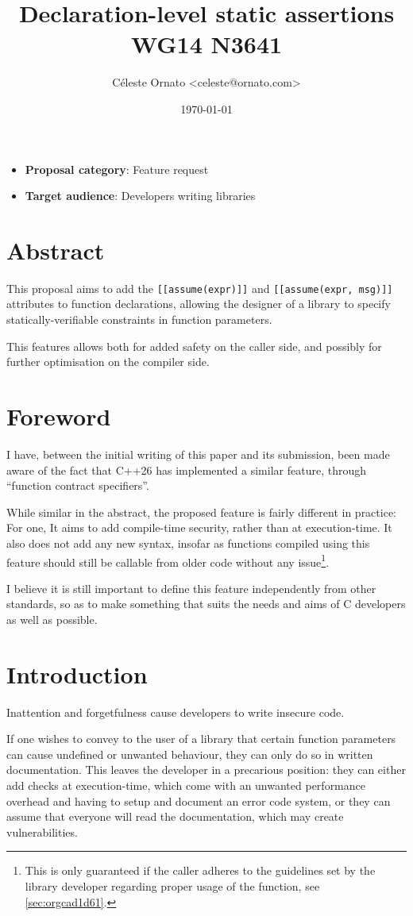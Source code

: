 \documentclass[a4paper, 12pt]{article}
\author{Céleste Ornato <celeste@ornato.com>}
\date{\today}
\title{Declaration-level static assertions\\\medskip
\large WG14 N3641}
\begin{document}
\maketitle
\begin{itemize}
\item \textbf{Proposal category}: Feature request
\item \textbf{Target audience}: Developers writing libraries
\end{itemize}
\section{Abstract}
\label{sec:org43b546d}
This proposal aims to add the \texttt{[[assume(expr)]]} and \texttt{[[assume(expr, msg)]]}
attributes to function declarations, allowing the designer of a library to specify
statically-verifiable constraints in function parameters.

This features allows both for added safety on the caller side, and possibly for
further optimisation on the compiler side.
\section{Foreword}
\label{sec:org2d2a0d4}
I have, between the initial writing of this paper and its submission, been made aware
of the fact that C++26 has implemented a similar feature, through ``function contract
specifiers''.

While similar in the abstract, the proposed feature is fairly different in practice:
For one, It aims to add compile-time security, rather than at execution-time.
It also does not add any new syntax, insofar as functions compiled using this feature
should still be callable from older code without any issue\footnote{This is only guaranteed if the caller adheres to the guidelines set by the library
developer regarding proper usage of the function, see \ref{sec:orgcad1d61}.}.

I believe it is still important to define this feature independently from other standards,
so as to make something that suits the needs and aims of C developers as well as possible.
\section{Introduction}
\label{sec:org5a4c6a6}
Inattention and forgetfulness cause developers to write insecure code.

If one wishes to convey to the user of a library that certain function parameters
can cause undefined or unwanted behaviour, they can only do so in written
documentation.  This leaves the developer in a precarious position: they can
either add checks at execution-time, which come with an unwanted performance
overhead and having to setup and document an error code system,
or they can assume that everyone will read the documentation, which may create
vulnerabilities.
\end{document}
